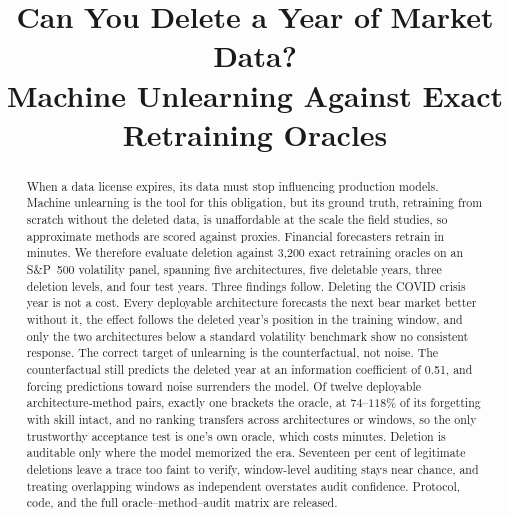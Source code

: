 \documentclass[sigconf,anonymous,review]{acmart}
\begin{document}
\title[Can You Delete a Year of Market Data?]{Can You Delete a Year of
Market Data?\\ Machine Unlearning Against Exact Retraining Oracles}

\begin{abstract}
When a data license expires, its data must stop influencing
production models. Machine unlearning is the tool for this
obligation, but its ground truth, retraining from scratch without
the deleted data, is unaffordable at the scale the field studies,
so approximate methods are scored against proxies. Financial
forecasters retrain in minutes. We therefore evaluate deletion
against 3{,}200 exact retraining oracles on an S\&P~500 volatility
panel, spanning five architectures, five deletable years, three
deletion levels, and four test years. Three findings follow.
Deleting the COVID crisis year is not a cost. Every deployable
architecture forecasts the next bear market better without it, the
effect follows the deleted year's position in the training window,
and only the two architectures below a standard volatility
benchmark show no consistent response. The correct target of
unlearning is the counterfactual, not noise. The counterfactual
still predicts the deleted year at an information coefficient of
0.51, and forcing predictions toward noise surrenders the model. Of
twelve deployable architecture-method pairs, exactly one brackets
the oracle, at $74$--$118\%$ of its forgetting with skill intact,
and no ranking transfers across architectures or windows, so the
only trustworthy acceptance test is one's own oracle, which costs
minutes. Deletion is auditable only where the model memorized the
era. Seventeen per cent of legitimate deletions leave a trace too
faint to verify, window-level auditing stays near chance, and
treating overlapping windows as independent overstates audit
confidence. Protocol, code, and the full oracle--method--audit
matrix are released.
\end{abstract}

\maketitle












\end{document}
